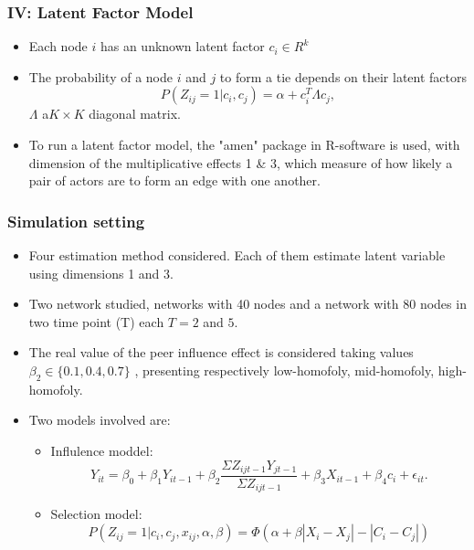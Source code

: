 \documentclass{beamer}
\begin{document}
\begin{frame}
\frametitle{IV: Latent Factor Model}
\begin{itemize}
\item Each node $i$ has an unknown latent factor $c_{i}\in R^{k}$
\vspace{10pt}
\item The probability of a node $i$  and $j$ to form a tie depends on their latent factors
 \[P(Z_{ij}=1|c_{i},c_{j})=\alpha+ c_{i}^{T} \Lambda c_{j}
    \label{3},\]  $\Lambda$ a$ K\times K$ diagonal matrix.
\vspace{10pt}
\item To run a latent factor model, the "amen" package in R-software is used,  with dimension of the multiplicative effects 1 \& 3, which measure of how likely a pair of actors are to form an edge with one another.

\end{itemize}
\end{frame}
\begin{frame}
\frametitle{Simulation setting}
\begin{itemize}
\item Four estimation method  considered. Each of them estimate latent variable using  dimensions 1 and 3.
\vspace{10pt}
\item{Two network studied, networks with 40 nodes and a  network with 80 nodes in two time point (T) each $T=2$ and $5$.}
\vspace{10pt}
\item{The real value of the peer influence effect is considered taking values $\beta_{2} \in \{ 0.1, 0.4, 0.7\}$ }, presenting respectively low-homofoly, mid-homofoly, high-homofoly.
\vspace{10pt}
\item{Two models involved are:}
\begin{itemize}
    \item  Influlence moddel: \[  Y_{it}=\beta_{0}+\beta_{1}Y_{i t-1}+\beta_{2} \frac{\Sigma Z_{ij t-1}Y_{j t-1}}{\Sigma Z_{ijt-1}}+ \beta_{3}X_{it-1}+\beta_{4}c_{i}+\epsilon_{it}.\] 

\item{Selection model:}
 \[ P(Z_{ij}=1|c_{i},c_{j},x_{ij},\alpha, \beta)= \Phi(\alpha+\beta |X_{i}-X_{j}|-|C_{i}-C_{j}|)
    \label{eq.4}\]
\end{itemize}
\end{itemize}
\end{frame}
\end{document}
